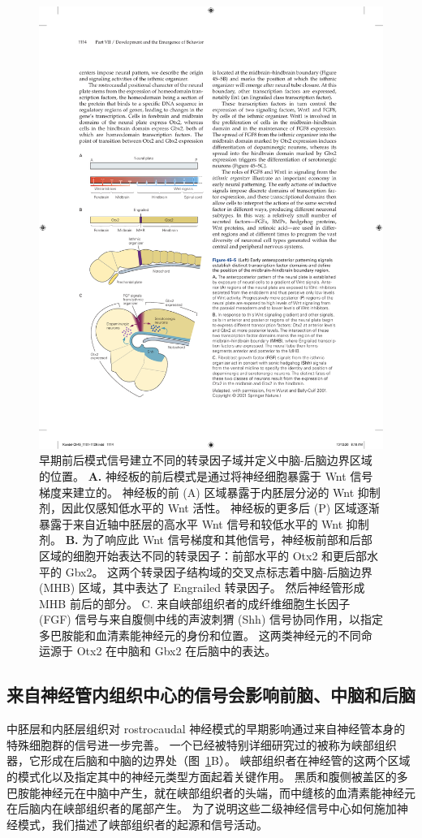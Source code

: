 \begin{figure}[htbp]
	\centering
	\includegraphics[width=0.5\linewidth]{chap45/fig_45_5}
	\caption{早期前后模式信号建立不同的转录因子域并定义中脑-后脑边界区域的位置。
		\textbf{A.} 神经板的前后模式是通过将神经细胞暴露于 Wnt 信号梯度来建立的。
		神经板的前 (A) 区域暴露于内胚层分泌的 Wnt 抑制剂，因此仅感知低水平的 Wnt 活性。
		神经板的更多后 (P) 区域逐渐暴露于来自近轴中胚层的高水平 Wnt 信号和较低水平的 Wnt 抑制剂。
		\textbf{B.} 为了响应此 Wnt 信号梯度和其他信号，神经板前部和后部区域的细胞开始表达不同的转录因子：前部水平的 Otx2 和更后部水平的 Gbx2。
		这两个转录因子结构域的交叉点标志着中脑-后脑边界 (MHB) 区域，其中表达了 Engrailed 转录因子。 然后神经管形成 MHB 前后的部分。
		C. 来自峡部组织者的成纤维细胞生长因子 (FGF) 信号与来自腹侧中线的声波刺猬 (Shh) 信号协同作用，以指定多巴胺能和血清素能神经元的身份和位置。
		这两类神经元的不同命运源于 Otx2 在中脑和 Gbx2 在后脑中的表达\cite{wurst2001neural}。}
	\label{fig:45_5}
\end{figure}



\subsection{来自神经管内组织中心的信号会影响前脑、中脑和后脑}

中胚层和内胚层组织对 rostrocaudal 神经模式的早期影响通过来自神经管本身的特殊细胞群的信号进一步完善。
一个已经被特别详细研究过的被称为峡部组织器，它形成在后脑和中脑的边界处（图~\ref{fig:45_5}B）。
峡部组织者在神经管的这两个区域的模式化以及指定其中的神经元类型方面起着关键作用。
黑质和腹侧被盖区的多巴胺能神经元在中脑中产生，就在峡部组织者的头端，而中缝核的血清素能神经元在后脑内在峡部组织者的尾部产生。
为了说明这些二级神经信号中心如何施加神经模式，我们描述了峡部组织者的起源和信号活动。


